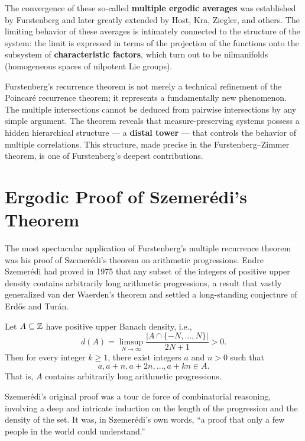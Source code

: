 The convergence of these so-called \textbf{multiple ergodic averages} was established by Furstenberg and later greatly extended by Host, Kra, Ziegler, and others. The limiting behavior of these averages is intimately connected to the structure of the system: the limit is expressed in terms of the projection of the functions onto the subsystem of \textbf{characteristic factors}, which turn out to be nilmanifolds (homogeneous spaces of nilpotent Lie groups).

Furstenberg's recurrence theorem is not merely a technical refinement of the Poincar\'e recurrence theorem; it represents a fundamentally new phenomenon. The multiple intersections cannot be deduced from pairwise intersections by any simple argument. The theorem reveals that measure-preserving systems possess a hidden hierarchical structure --- a \textbf{distal tower} --- that controls the behavior of multiple correlations. This structure, made precise in the Furstenberg--Zimmer theorem, is one of Furstenberg's deepest contributions.

\section{Ergodic Proof of Szemer\'edi's Theorem}

The most spectacular application of Furstenberg's multiple recurrence theorem was his proof of Szemer\'edi's theorem on arithmetic progressions. Endre Szemer\'edi had proved in 1975 that any subset of the integers of positive upper density contains arbitrarily long arithmetic progressions, a result that vastly generalized van der Waerden's theorem and settled a long-standing conjecture of Erd\H{o}s and Tur\'an.

\begin{theorem}
Let \(A \subseteq \mathbb{Z}\) have positive upper Banach density, i.e.,
\[
\overline{d}(A) = \limsup_{N \to \infty} \frac{|A \cap \{-N,\dots,N\}|}{2N+1} > 0.
\]
Then for every integer \(k \geq 1\), there exist integers \(a\) and \(n > 0\) such that
\[
a, a+n, a+2n, \dots, a+kn \in A.
\]
That is, \(A\) contains arbitrarily long arithmetic progressions.
\end{theorem}

Szemer\'edi's original proof was a tour de force of combinatorial reasoning, involving a deep and intricate induction on the length of the progression and the density of the set. It was, in Szemer\'edi's own words, ``a proof that only a few people in the world could understand.''

